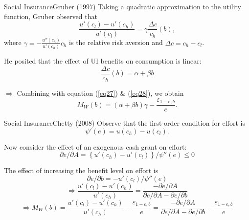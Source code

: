 \documentclass{beamer}
\begin{document}
\begin{frame}{Social Insurance}{Gruber (1997)}
	Taking a quadratic approximation to the utility function, Gruber observed that
	\begin{equation}\label{eq28}
		\frac{u'(c_l)-u'(c_h)}{u'(c_l)} = \gamma \frac{\Delta c}{c_h}(b),
	\end{equation}
	where $\gamma = -\frac{u''(c_h)}{u'(c_h)}c_h$ is the relative risk aversion and $\Delta c = c_h - c_l$.
	\medskip

	He posited that the effect of UI benefits on consumption is linear:
	\begin{equation}
		\frac{\Delta c}{c_h}(b)=\alpha + \beta b
	\end{equation}

	$\Rightarrow$ Combining with equation (\ref{eq27}) \& (\ref{eq28}), we obtain
	\begin{equation}
		M_W(b) = (\alpha+\beta b)\gamma - \frac{\varepsilon_{1-e,b}}{e}.
	\end{equation}
\end{frame}
\begin{frame}{Social Insurance}{Chetty (2008)}
	Observe that the first-order condition for effort is
	\begin{equation}
		\psi'(e) = u(c_h) - u(c_l).
	\end{equation}

	Now consider the effect of an exogenous cash grant on effort:
	\begin{equation}
		\partial e/\partial A = \left\{u'(c_h)-u'(c_l)\right\}/\psi''(e) \leq 0
	\end{equation}

	The effect of increasing the benefit level on effort is
	\begin{equation}
		\partial e/\partial b = -u'(c_l)/\psi''(e)
	\end{equation}
	\begin{equation}
		\Rightarrow \frac{u'(c_l)-u'(c_h)}{u'(c_h)} = \frac{-\partial e/\partial A}{\partial e/\partial A-\partial e/\partial b}
	\end{equation}
	\begin{equation}
		\Rightarrow M_W(b)= \frac{u'(c_l)-u'(c_h)}{u'(c_h)}- \frac{\varepsilon_{1-e,b}}{e} =\frac{-\partial e/\partial A}{\partial e/\partial A-\partial e/\partial b} - \frac{\varepsilon_{1-e,b}}{e}
	\end{equation}
\end{frame}
\end{document}
